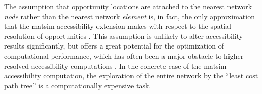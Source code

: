 %
%

%

The assumption that opportunity locations are attached to the nearest network \textit{node} rather than the nearest 
network \textit{element} is, in fact, the only approximation that the \gls{matsim}
accessibility extension makes with respect to the spatial resolution of opportunities 
\citep{NicolaiNagel2012HiResAccessibilityMethodInBook}. This assumption is unlikely to alter accessibility 
results significantly, but offers a great potential for the
optimization of computational performance, which has often been a major obstacle to higher-resolved 
accessibility computations \citep{Kwan1998PointBasedAccessibility, BuettnerEtAl2010Erreichbarkeitsatlas}. 
In the concrete case of the \gls{matsim} accessibility computation, the exploration of the entire network 
by the ``least cost path tree'' is a computationally expensive task.

